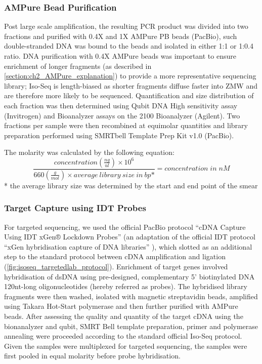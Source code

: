 \subsubsection{AMPure Bead Purification} 
Post large scale amplification, the resulting PCR product was divided into two fractions and purified with 0.4X and 1X AMPure PB beads (PacBio), such double-stranded DNA was bound to the beads and isolated in either 1:1 or 1:0.4 ratio. DNA purification with 0.4X AMPure beads was important to ensure enrichment of longer fragments (as described in \cref{section:ch2_AMPure_explanation}) to provide a more representative sequencing library; Iso-Seq is length-biased as shorter fragments diffuse faster into ZMW and are therefore more likely to be sequenced. Quantification and size distribution of each fraction was then determined using Qubit DNA High sensitivity assay (Invitrogen) and Bioanalyzer assays on the 2100 Bioanalyzer (Agilent). Two fractions per sample were then recombined at equimolar quantities and library preparation performed using SMRTbell Template Prep Kit v1.0 (PacBio). 

The molarity was calculated by the following equation: 
\begin{equation}
	\label{eqn:isoseq_library_molarity}
	\frac{concentration(\frac{ng}{ul})\times 10^6}{660(\frac{g}{mol}) \times average\:library\:size\:in\:bp\mbox{*}} = concentration\;in\; nM
\end{equation}
* the average library size was determined by the start and end point of the smear

\subsubsection{Target Capture using IDT Probes} 
\label{section:ch2_targetcapture_explanation} 
For targeted sequencing, we used the official PacBio protocol “cDNA Capture Using IDT
xGen® Lockdown Probes” (an adaptation of the official IDT protocol “xGen hybridisation capture of DNA libraries” ), which slotted as an additional step to the standard protocol between cDNA amplification and ligation (\cref{fig:isoseq_targetedlab_protocol}). Enrichment of target genes involved hybridisation of dsDNA using pre-designed, complementary 5’ biotinylated DNA 120nt-long oligonucleotides (hereby referred as probes). The hybridised library fragments were then washed, isolated with magnetic streptavidin beads, amplified using Takara Hot-Start polymerase and then further purified with AMPure beads. After assessing the quality and quantity of the target cDNA using the bionanalyzer and qubit, SMRT Bell template preparation, primer and polymerase annealing were proceeded according to the standard official Iso-Seq protocol. Given the samples were multiplexed for targeted sequencing, the samples were first pooled in equal molarity before probe hybridisation.  

